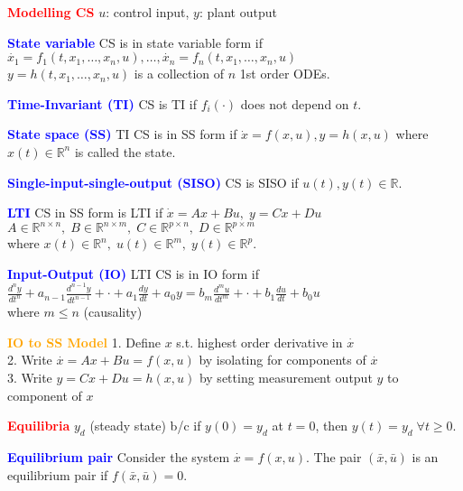\documentclass[5pt]{extarticle} %
\begin{document}
\begin{paracol}{3}
    {\tiny

    \textcolor{red}{\textbf{Modelling CS}} $u$: control input, $y$: plant output

    \textcolor{blue}{\textbf{State variable}} CS is in state variable form if \\ 
    $\overset{\cdot}{x}_1 = f_1 (t,x_1,\ldots,x_n,u), \ldots, \overset{\cdot}{x}_n = f_n (t,x_1,\ldots,x_n,u)$ \\
    $y=h(t,x_1,\ldots,x_n,u)$ is a collection of $n$ 1st order ODEs. 

    \textcolor{blue}{\textbf{Time-Invariant (TI)}} CS is TI if $f_i(\cdot)$ does not depend on $t$.

    \textcolor{blue}{\textbf{State space (SS)}} TI CS is in SS form if $ \dot{x} = f(x, u), y = h(x, u)$ where $x(t) \in \mathbb{R}^n$ is called the state.

    \textcolor{blue}{\textbf{Single-input-single-output (SISO)}} CS is SISO if $u(t), y(t) \in \mathbb{R}$.

    \textcolor{blue}{\textbf{LTI}} CS in SS form is LTI if $ \dot{x} = Ax + Bu, \; y = Cx + Du$ \\
    $A \in \mathbb{R}^{n \times n}, \; B \in \mathbb{R}^{n \times m}, \; C \in \mathbb{R}^{p \times n}, \; D \in \mathbb{R}^{p \times m}$ \\ 
    where $ x(t) \in \mathbb{R}^n, \; u(t) \in \mathbb{R}^m, \; y(t) \in \mathbb{R}^p. $

    \textcolor{blue}{\textbf{Input-Output (IO)}} LTI CS is in IO form if \\
    $ \frac{d^n y}{dt^n} + a_{n-1} \frac{d^{n-1} y}{dt^{n-1}} + \cdot + a_1 \frac{dy}{dt} + a_0 y = b_m \frac{d^m u}{dt^m} + \cdot + b_1 \frac{du}{dt} + b_0 u $ \\
    where $ m \leq n$ (causality)

    \textcolor{orange}{\textbf{IO to SS Model}} 1.  Define $x$ s.t. highest order derivative in $\overset{\cdot}{x}$ \\
    2. Write $\overset{\cdot}{x} = Ax + Bu = f(x,u)$ by isolating for components of $\overset{\cdot}{x}$\\ 
    3. Write $y = Cx + Du = h(x,u)$ by setting measurement output $y$ to component of $x$ 

    \textcolor{red}{\textbf{Equilibria}} $y_d$ (steady state) b/c if $y(0) = y_d$ at $t=0$, then $y(t) = y_d \; \forall t \geq 0$.

    \textcolor{blue}{\textbf{Equilibrium pair}} Consider the system $\overset{\cdot}{x} = f(x,u)$. The pair $(\bar{x}, \bar{u})$ is an equilibrium pair if $f(\bar{x}, \bar{u}) = 0$.

}
\end{paracol}
\end{document}
